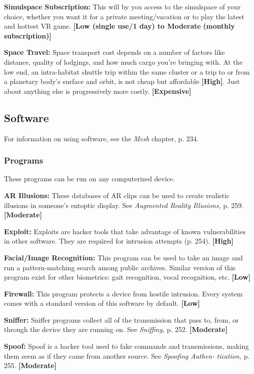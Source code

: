 \textbf{Simulspace Subscription: }This will by you access to 
the simulspace of your choice, whether you want it for 
a private meeting/vacation or to play the latest and 
hottest VR game. \textbf{[Low (single use/1 day) to Moderate }
\textbf{(monthly subscription)]}

\textbf{Space Travel:} Space transport cost depends on a 
number of factors like distance, quality of lodgings, 
and how much cargo you're bringing with. At the low 
end, an intra-habitat shuttle trip within the same cluster
or a trip to or from a planetary body's surface and
orbit, is not cheap but affordable \textbf{[High]}. Just about 
anything else is progressively more costly. \textbf{[Expensive]}

\subsection{Software}

For information on using software, see the \textit{Mesh }
chapter, p. 234.

\subsubsection{Programs}

These programs can be run on any computerized device.

\textbf{AR Illusions:} These databases of AR clips can be used 
to create realistic illusions in someone's entoptic display. 
See \textit{Augmented Reality Illusions,} p. 259. \textbf{[Moderate]}

\textbf{Exploit:} Exploits are hacker tools that take advantage
of known vulnerabilities in other software. They
are required for intrusion attempts (p. 254). \textbf{[High]}

\textbf{Facial/Image Recognition:} This program can be 
used to take an image and run a pattern-matching 
search among public archives. Similar version of this 
program exist for other biometrics: gait recognition, 
vocal recognition, etc. \textbf{[Low]}

\textbf{Firewall:} This program protects a device from 
hostile intrusion. Every system comes with a standard 
version of this software by default. \textbf{[Low]}

\textbf{Sniffer:} Sniffer programs collect all of the transmission
that pass to, from, or through the device they are
running on. See \textit{Sniffing,} p. 252. \textbf{[Moderate]}

\textbf{Spoof:} Spoof is a hacker tool used to fake commands
and transmissions, making them seem as if
they came from another source. See \textit{Spoofing Authen-}
\textit{tication,} p. 255. \textbf{[Moderate]}

